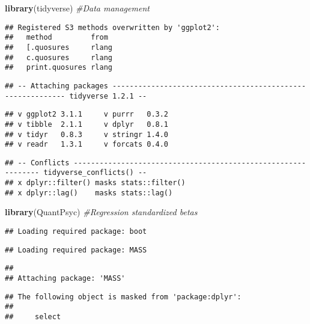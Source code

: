 \documentclass[]{article}
\title{}
\author{}
\date{}
\newenvironment{Shaded}{\begin{snugshade}}{\end{snugshade}}
\newcommand{\CommentTok}[1]{\textcolor[rgb]{0.56,0.35,0.01}{\textit{#1}}}
\newcommand{\KeywordTok}[1]{\textcolor[rgb]{0.13,0.29,0.53}{\textbf{#1}}}
\newcommand{\NormalTok}[1]{#1}
\begin{document}
\begin{Shaded}
\begin{Highlighting}[]
\KeywordTok{library}\NormalTok{(tidyverse)  }\CommentTok{#Data management}
\end{Highlighting}
\end{Shaded}

\begin{verbatim}
## Registered S3 methods overwritten by 'ggplot2':
##   method         from 
##   [.quosures     rlang
##   c.quosures     rlang
##   print.quosures rlang
\end{verbatim}

\begin{verbatim}
## -- Attaching packages ----------------------------------------------------------- tidyverse 1.2.1 --
\end{verbatim}

\begin{verbatim}
## v ggplot2 3.1.1     v purrr   0.3.2
## v tibble  2.1.1     v dplyr   0.8.1
## v tidyr   0.8.3     v stringr 1.4.0
## v readr   1.3.1     v forcats 0.4.0
\end{verbatim}

\begin{verbatim}
## -- Conflicts -------------------------------------------------------------- tidyverse_conflicts() --
## x dplyr::filter() masks stats::filter()
## x dplyr::lag()    masks stats::lag()
\end{verbatim}

\begin{Shaded}
\begin{Highlighting}[]
\KeywordTok{library}\NormalTok{(QuantPsyc)  }\CommentTok{#Regression standardized betas}
\end{Highlighting}
\end{Shaded}

\begin{verbatim}
## Loading required package: boot
\end{verbatim}

\begin{verbatim}
## Loading required package: MASS
\end{verbatim}

\begin{verbatim}
## 
## Attaching package: 'MASS'
\end{verbatim}

\begin{verbatim}
## The following object is masked from 'package:dplyr':
## 
##     select
\end{verbatim}
\end{document}
